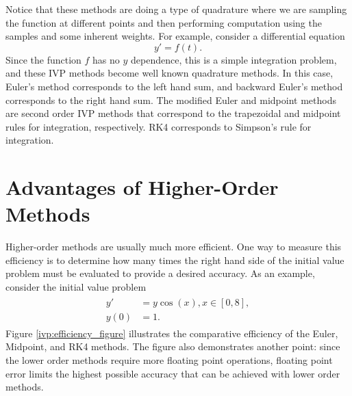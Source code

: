 Notice that these methods are doing a type of quadrature where we are sampling the function at different points and then performing computation using the samples and some inherent weights. 
For example, consider a differential equation 
\[ y' = f(t).\]
Since the function $f$ has no $y$ dependence, this is a simple integration problem, and these IVP methods become well known quadrature methods. In this case, Euler's method corresponds to the left hand sum, and backward Euler's method corresponds to the right hand sum. 
The modified Euler and midpoint methods are second order IVP methods that correspond to the trapezoidal and midpoint rules for integration, respectively. RK4 corresponds to Simpson's rule for integration.

\section*{Advantages of Higher-Order Methods} 

Higher-order methods are usually much more efficient. One way to measure this efficiency is to determine how many times the right hand side of the initial value problem must be evaluated to provide a desired accuracy.  As an example, consider the initial value problem 
\begin{align}
	\begin{split}
		y' &= y \cos(x), x \in [0,8],\\
		y(0) &= 1. 
	\end{split}
	\label{ivp:efficiency_problem}
\end{align}
Figure \ref{ivp:efficiency_figure} illustrates the comparative efficiency of the Euler, Midpoint, and RK4 methods.  The figure also demonstrates another point: since the lower order methods require more floating point operations, floating point error limits the highest possible accuracy that can be achieved with lower order methods. 


